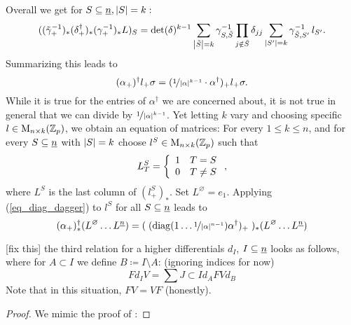 \begin{rem}
    Overall we get for $S \subseteq \underline{n}, \left\vert S\right\vert = k:$
    \begin{displaymath}
      ( (\tilde\gamma_+^{-1})_* (\delta^\dagger_+)_* (\gamma_+^{-1})_* L )_S=%
        \det(\delta)^{k-1} \sum_{\abs{\tilde S} = k} \gamma^{-1}_{S,\tilde S}%
        \prod_{j \notin \tilde S} \delta_{jj} \sum_{ \abs{S^\prime} = k } %
        \gamma^{-1}_{\tilde S,S^\prime}\, l_{S^\prime}.
    \end{displaymath}
    Summarizing this leads to
    \begin{equation}\label{eq_dagger_comparison}
      (\alpha_+)^\dagger l_+ \sigma = %
        (\nicefrac{1}{\abs\alpha^{k-1}}\cdot\alpha^\dagger)_+ %
        l_+ \sigma.
    \end{equation}
    While it is true for the entries of $\alpha^\dagger$ we are concerned about,
    it is not true in general that we can divide by
    $\nicefrac{1}{\left\vert\alpha\right\vert^{k-1}}$. Yet letting $k$ vary and choosing specific
    $l \in \mathrm{M}_{n \times k}(\mathbb{Z}_p)$, we obtain an equation of matrices: For every
    $1 \leq k \leq n$, and for every $S \subseteq \underline{n}$ with $\left\vert S\right\vert = k$
    choose $l^S \in \mathrm{M}_{n \times k}(\mathbb{Z}_p)$ such that
    \begin{displaymath}
      L^S_T = \left\{ \begin{array}{ll} 1 & T=S \\ 0 & T \neq S \end{array} \right.,
    \end{displaymath}
    where $L^S$ is the last column of $(l^S_+)_*$. Set $L^\varnothing = e_1$.
    Applying (\ref{eq_diag_dagger}) to $l^S$ for all $S \subseteq \underline{n}$ leads
    to
    \begin{displaymath}
      (\alpha_+)^\dagger_*( L^\varnothing \ldots L^{\ind{n}} ) = %
        ( \; ( \diag( 1 \ldots \nicefrac{1}{\abs\alpha^{n-1}} ) %
        \alpha^\dagger )_+ \; )_* ( L^\varnothing \ldots L^{\ind{n}} )
    \end{displaymath}
  \end{rem}
  \begin{lem}\label{lem_rel_FdV_higher_differentials}
    [fix this] the third relation for a higher differentials $d_I$, $I \subseteq
    \underline{n}$ looks as follows, where for $A \subset I$ we define $B \coloneqq I
    \setminus A$: (ignoring indices for now)
    \begin{equation*}
      F d_I V = \sum{J \subset I} d_A FV d_B
    \end{equation*}
    Note that in this situation, $FV = VF$ (honestly).
    \begin{proof}
      We mimic the proof of \cite[Thm. 3.21]{carlsson2011higher}:
    \end{proof}
  \end{lem}
